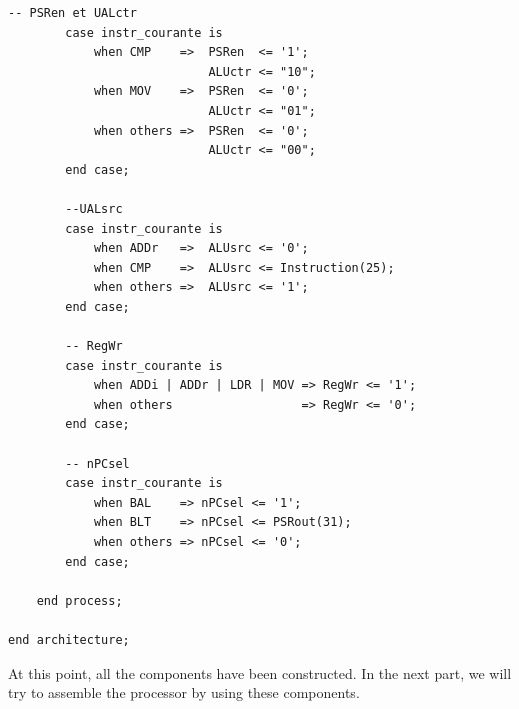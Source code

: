 \begin{lstlisting}[style=vhdl,columns=fixed, breaklines]
		-- PSRen et UALctr
		case instr_courante is
			when CMP 	=> 	PSRen  <= '1';
							ALUctr <= "10";
			when MOV	=> 	PSRen  <= '0';
							ALUctr <= "01";
			when others => 	PSRen  <= '0';
							ALUctr <= "00";
		end case;
		
		--UALsrc
		case instr_courante is
			when ADDr   => 	ALUsrc <= '0';
			when CMP    => 	ALUsrc <= Instruction(25);
			when others => 	ALUsrc <= '1';
		end case;
		
		-- RegWr
		case instr_courante is
			when ADDi | ADDr | LDR | MOV => RegWr <= '1';
			when others                  => RegWr <= '0';
		end case;
		
		-- nPCsel
		case instr_courante is
			when BAL    => nPCsel <= '1';
			when BLT    => nPCsel <= PSRout(31);
			when others => nPCsel <= '0';
		end case;
		
	end process;

end architecture;
\end{lstlisting}


At this point, all the components have been constructed. 
In the next part, we will try to assemble the processor by using these components.
